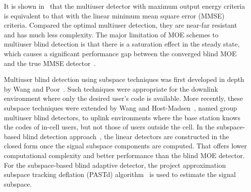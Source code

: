 \documentclass[a4paper,11pt,fleqn]{article}
\begin{document}
It is shown in~\cite{Honi95} that the multiuser detector with
maximum output energy criteria is equivalent to that with the
linear minimum mean square error (MMSE) criteria. Compared the
optimal multiuser detection, they are near-far resistant and has
much less complexity. The major limitation of MOE schemes to
multiuser blind detection is that there is a saturation effect in
the steady state, which causes a significant performance gap
between the converged blind MOE and the true MMSE
detector~\cite{Honi95}.

Multiuser blind detection using subspace techniques was first
developed in depth by Wang and Poor~\cite{Wang98, Poor98}. Such
techniques were appropriate for the downlink environment where
only the desired user's code is available. More recently, these
subspace techniques were extended by Wang and
Host-Madsen~\cite{Wang99}, named group multiuser blind detectors,
to uplink environments where the base station knows the codes of
in-cell users, but not those of users outside the cell. In the
subspace-based blind detection approach~\cite{Wang98}, the linear
detectors are constructed in the closed form once the signal
subspace components are computed. That offers lower computational
complexity and better performance than the blind MOE detector. For
the subspace-based blind adaptive detector, the project
approximation subspace tracking deflation (PASTd)
algorithm~\cite{Yang95} is used to estimate the signal subspace.
\end{document}
